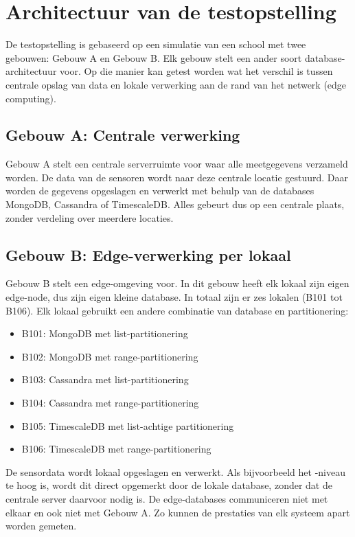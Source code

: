 \section{Architectuur van de testopstelling}
\label{sec:architectuur-testopstelling}

De testopstelling is gebaseerd op een simulatie van een school met twee gebouwen: Gebouw A en Gebouw B. Elk gebouw stelt een ander soort database-architectuur voor. Op die manier kan getest worden wat het verschil is tussen centrale opslag van data en lokale verwerking aan de rand van het netwerk (edge computing).

\subsection{Gebouw A: Centrale verwerking}

Gebouw A stelt een centrale serverruimte voor waar alle meetgegevens verzameld worden. De data van de sensoren wordt naar deze centrale locatie gestuurd. Daar worden de gegevens opgeslagen en verwerkt met behulp van de databases MongoDB, Cassandra of TimescaleDB. Alles gebeurt dus op een centrale plaats, zonder verdeling over meerdere locaties.

\subsection{Gebouw B: Edge-verwerking per lokaal}

Gebouw B stelt een edge-omgeving voor. In dit gebouw heeft elk lokaal zijn eigen edge-node, dus zijn eigen kleine database. In totaal zijn er zes lokalen (B101 tot B106). Elk lokaal gebruikt een andere combinatie van database en partitionering:

\begin{itemize}
  \item B101: MongoDB met list-partitionering
  \item B102: MongoDB met range-partitionering
  \item B103: Cassandra met list-partitionering
  \item B104: Cassandra met range-partitionering
  \item B105: TimescaleDB met list-achtige partitionering
  \item B106: TimescaleDB met range-partitionering
\end{itemize}

De sensordata wordt lokaal opgeslagen en verwerkt. Als bijvoorbeeld het -niveau te hoog is, wordt dit direct opgemerkt door de lokale database, zonder dat de centrale server daarvoor nodig is. De edge-databases communiceren niet met elkaar en ook niet met Gebouw A. Zo kunnen de prestaties van elk systeem apart worden gemeten.

